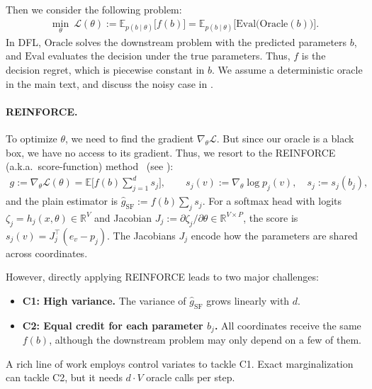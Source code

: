 \documentclass[10pt]{article}
\providecommand{\E}{\mathbb{E}}
\providecommand{\gL}{\mathcal{L}}
\providecommand{\R}{\mathbb{R}}
\theoremstyle{plain}
\theoremstyle{definition}
\theoremstyle{remark}
\theoremstyle{definition}
\newcommand{\score}[1]{s_{#1}}               %
\newcommand{\gtrue}{g}                       %
\newcommand{\rf}{\hat g_{\mathrm{SF}}}       %
\newcommand{\pj}[1]{p_{#1}}                  %
\begin{document}
Then we consider the following problem:
\begin{align}\label{eq:objective}
    \min_{\theta}\ \gL(\theta):=\E_{p(b\mid\theta)}\big[f(b)\big]=\E_{p(b\mid\theta)}\big[\mathrm{Eval}\big(\mathrm{Oracle}(b)\big)\big].
\end{align}
In DFL, $\mathrm{Oracle}$ solves the downstream problem with the predicted parameters $b$, and $\mathrm{Eval}$ evaluates the decision under the true parameters. Thus, $f$ is the decision regret, which is piecewise constant in $b$. We assume a deterministic oracle in the main text, and discuss the noisy case in .

\paragraph{REINFORCE.}
To optimize $\theta$, we need to find the gradient $\nabla_\theta\gL$. But since our oracle is a black box, we have no access to its gradient. Thus, we resort to the REINFORCE (a.k.a.\ score-function) method~\cite{williams1992} (see ):
\begin{align}\label{eq:sf}
    \gtrue:=\nabla_\theta\gL(\theta)=\E\Big[f(b)\sum_{j=1}^{d}\score{j}\Big],
    \qquad
    \score{j}(v):=\nabla_\theta\log\pj{j}(v),\quad \score{j}:=\score{j}(b_j),
\end{align}
and the plain estimator is $\rf:=f(b)\sum_j\score{j}$. For a softmax head with logits $\zeta_j=h_j(x,\theta)\in\R^{V}$ and Jacobian $J_j:=\partial\zeta_j/\partial\theta\in\R^{V\times P}$, the score is $\score{j}(v)=J_j^{\top}(e_v-\pj{j})$. The Jacobians $J_j$ encode how the parameters are shared across coordinates.

However, directly applying REINFORCE leads to two major challenges:
\begin{itemize}
    \item \textbf{C1: High variance.} The variance of $\rf$ grows linearly with $d$.
    \item \textbf{C2: Equal credit for each parameter $b_j$.} All coordinates receive the same $f(b)$, although the downstream problem may only depend on a few of them.
\end{itemize}
A rich line of work employs control variates to tackle C1. Exact marginalization can tackle C2, but it needs $d\cdot V$ oracle calls per step.
\end{document}
